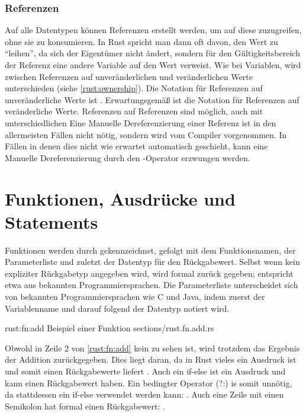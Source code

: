 \subsubsection{Referenzen}
\label{rust:reference}

Auf alle Datentypen können Referenzen erstellt werden, um auf diese zuzugreifen, ohne sie zu konsumieren.
In Rust spricht man dann oft davon, den Wert zu \enquote{leihen}, da sich der Eigentümer nicht ändert, sondern für den Gültigkeitsbereich der Referenz eine andere Variable auf den Wert verweist.
Wie bei Variablen, wird zwischen Referenzen auf unveränderlichen und veränderlichen Werte unterschieden (siehe \autoref{rust:ownership}).
Die Notation für Referenzen auf unveränderliche Werte ist .
Erwartungsgemäß ist  die Notation für Referenzen auf veränderliche Werte.
Referenzen auf Referenzen sind möglich, auch mit unterschiedlichen
Eine Manuelle Dereferenzierung einer Referenz ist in den allermeisten Fällen nicht nötig, sondern wird vom Compiler vorgenommen.
In Fällen in denen dies nicht wie erwartet automatisch geschieht, kann eine Manuelle Dereferenzierung durch den \rustcinline{*}-Operator erzwungen werden.

\section{Funktionen, Ausdrücke und Statements}
\label{rust:fn}

Funktionen werden durch  gekennzeichnet, gefolgt mit dem Funktionsnamen, der Parameterliste und zuletzt der Datentyp für den Rückgabewert.
Selbst wenn kein expliziter Rückgabetyp angegeben wird, wird formal \rustcinline{()} zurück gegeben; \rustcinline{()} entspricht etwa  aus bekannten Programmiersprachen.
Die Parameterliste unterscheidet sich von bekannten Programmiersprachen wie C und Java, indem zuerst der Variablenname und darauf folgend der Datentyp notiert wird.

\rustcinclude
	{rust:fn:add}
	{Beispiel einer Funktion}
	{sections/rust.fn.add.rs}
	
Obwohl in Zeile 2 von \autoref{rust:fn:add} kein  zu sehen ist, wird trotzdem das Ergebnis der Addition zurückgegeben.
Dies liegt daran, da in Rust vieles ein Ausdruck ist und somit einen Rückgabewerte liefert \cite{rust:book:statements}.
Auch ein if-else ist ein Ausdruck und kann einen Rückgabewert haben.
Ein bedingter Operator (?:) is somit unnötig, da stattdessen ein if-else verwendet werden kann: . 
Auch eine Zeile mit einen Semikolon hat formal einen Rückgabewert: \rustcinline{()}.

